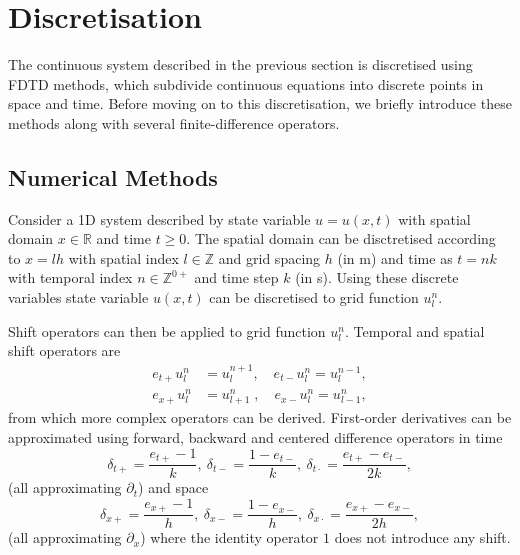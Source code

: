 \section{Discretisation}\label{sec:discrete}
The continuous system described in the previous section is discretised using FDTD methods, which subdivide continuous equations into discrete points in space and time. Before moving on to this discretisation, we briefly introduce these methods along with several finite-difference operators.

\subsection{Numerical Methods}\label{sec:numMeth}
Consider a 1D system described by state variable $u = u(x,t)$ with spatial domain $x\in \mathbb{R}$ and time $t\geq 0$. The spatial domain can be disctretised according to $x=lh$ with spatial index $l \in \mathbb{Z}$ and grid spacing $h$ (in m) and time as $t=nk$ with temporal index $n \in \mathbb{Z}^{0+}$ and time step $k$ (in s). Using these discrete variables state variable $u(x,t)$ can be discretised to grid function $u_l^n$. 

Shift operators can then be applied to grid function $u_l^n$. Temporal and spatial shift operators are
\begin{equation}
    \begin{aligned}
        e_{t+}u_l^n &= u_l^{n+1}, \quad e_{t-}u_l^n = u_l^{n-1},\\
        e_{x+}u_l^n &= u_{l+1}^n\;, \quad \!e_{x-}u_l^n = u_{l-1}^n,
    \end{aligned}
\end{equation}
from which more complex operators can be derived.
First-order derivatives can be approximated using forward, backward and centered difference operators in time
\begin{equation}\label{eq:discTimeOperators}
    \delta_{t+} = \frac{e_{t+} - 1}{k},\ \delta_{t-} = \frac{1 - e_{t-}}{k},\ \delta_{t\cdot} = \frac{e_{t+}-e_{t-}}{2k},
\end{equation}
(all approximating $\partial_t$) and space
\begin{equation}\label{eq:discSpaceOperators}
    \delta_{x+} = \frac{e_{x+} - 1}{h},\ \delta_{x-} = \frac{1 - e_{x-}}{h},\ \delta_{x\cdot} = \frac{e_{x+}-e_{x-}}{2h},
\end{equation} 
(all approximating $\partial_x$) where the identity operator $1$ does not introduce any shift.

